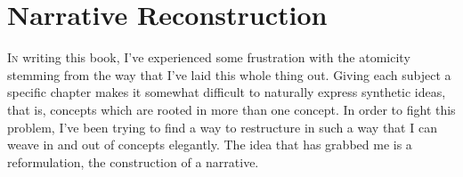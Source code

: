 \documentclass[../butidigress.tex]{subfiles}
\begin{document}
\chapter{Narrative Reconstruction}\label{chap:narrative}
\newpage

\lettrine{I}{n} writing this book, I've experienced some frustration with the atomicity stemming from the way that I've laid this whole thing out.
Giving each subject a specific chapter makes it somewhat difficult to naturally express synthetic ideas, that is, concepts which are rooted in more than one concept.
In order to fight this problem, I've been trying to find a way to restructure in such a way that I can weave in and out of concepts elegantly.
The idea that has grabbed me is a reformulation, the construction of a narrative.
\end{document}
